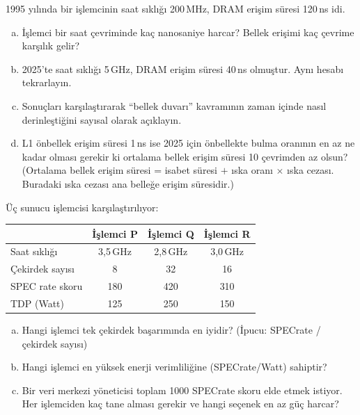 \begin{alistirma}[\orta]
1995 yılında bir işlemcinin saat sıklığı 200\,MHz, DRAM erişim süresi 120\,ns idi.
\begin{enumerate}[(a)]
    \item İşlemci bir saat çevriminde kaç nanosaniye harcar? Bellek erişimi kaç çevrime karşılık gelir?
    \item 2025'te saat sıklığı 5\,GHz, DRAM erişim süresi 40\,ns olmuştur. Aynı hesabı tekrarlayın.
    \item Sonuçları karşılaştırarak ``bellek duvarı'' kavramının zaman içinde nasıl derinleştiğini sayısal olarak açıklayın.
    \item L1 önbellek erişim süresi 1\,ns ise 2025 için önbellekte bulma oranının en az ne kadar olması gerekir ki ortalama bellek erişim süresi 10 çevrimden az olsun? (Ortalama bellek erişim süresi = isabet süresi $+$ ıska oranı $\times$ ıska cezası. Buradaki ıska cezası ana belleğe erişim süresidir.)
\end{enumerate}
\end{alistirma}

\begin{alistirma}[\zor]
Üç sunucu işlemcisi karşılaştırılıyor:

\begin{center}
\small
\begin{tabular}{lccc}
\toprule
& \textbf{İşlemci P} & \textbf{İşlemci Q} & \textbf{İşlemci R} \\
\midrule
Saat sıklığı & 3,5\,GHz & 2,8\,GHz & 3,0\,GHz \\
Çekirdek sayısı & 8 & 32 & 16 \\
SPEC rate skoru & 180 & 420 & 310 \\
TDP (Watt) & 125 & 250 & 150 \\
\bottomrule
\end{tabular}
\end{center}

\begin{enumerate}[(a)]
    \item Hangi işlemci tek çekirdek başarımında en iyidir? (İpucu: SPECrate / çekirdek sayısı)
    \item Hangi işlemci en yüksek enerji verimliliğine (SPECrate/Watt) sahiptir?
    \item Bir veri merkezi yöneticisi toplam 1000 SPECrate skoru elde etmek istiyor. Her işlemciden kaç tane alması gerekir ve hangi seçenek en az güç harcar?
\end{enumerate}
\end{alistirma}

